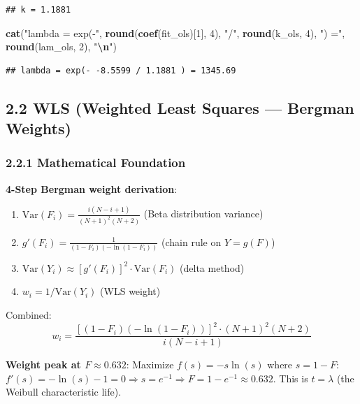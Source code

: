 \documentclass[
]{article}
\newenvironment{Shaded}{\begin{snugshade}}{\end{snugshade}}
\newcommand{\DecValTok}[1]{\textcolor[rgb]{0.00,0.00,0.81}{#1}}
\newcommand{\FunctionTok}[1]{\textcolor[rgb]{0.13,0.29,0.53}{\textbf{#1}}}
\newcommand{\NormalTok}[1]{#1}
\newcommand{\SpecialCharTok}[1]{\textcolor[rgb]{0.81,0.36,0.00}{\textbf{#1}}}
\newcommand{\StringTok}[1]{\textcolor[rgb]{0.31,0.60,0.02}{#1}}
\providecommand{\tightlist}{%
  \setlength{\itemsep}{0pt}\setlength{\parskip}{0pt}}
\begin{document}
\begin{verbatim}
## k = 1.1881
\end{verbatim}

\begin{Shaded}
\begin{Highlighting}[]
\FunctionTok{cat}\NormalTok{(}\StringTok{"lambda = exp({-}"}\NormalTok{, }\FunctionTok{round}\NormalTok{(}\FunctionTok{coef}\NormalTok{(fit\_ols)[}\DecValTok{1}\NormalTok{], }\DecValTok{4}\NormalTok{), }\StringTok{"/"}\NormalTok{, }\FunctionTok{round}\NormalTok{(k\_ols, }\DecValTok{4}\NormalTok{),}
    \StringTok{") ="}\NormalTok{, }\FunctionTok{round}\NormalTok{(lam\_ols, }\DecValTok{2}\NormalTok{), }\StringTok{"}\SpecialCharTok{\textbackslash{}n}\StringTok{"}\NormalTok{)}
\end{Highlighting}
\end{Shaded}

\begin{verbatim}
## lambda = exp(- -8.5599 / 1.1881 ) = 1345.69
\end{verbatim}

\subsection{2.2 WLS (Weighted Least Squares --- Bergman
Weights)}\label{wls-weighted-least-squares-bergman-weights}

\subsubsection{2.2.1 Mathematical
Foundation}\label{mathematical-foundation-1}

\textbf{4-Step Bergman weight derivation}:

\begin{enumerate}
\def\labelenumi{\arabic{enumi}.}
\tightlist
\item
  \(\text{Var}(F_i) = \frac{i(N-i+1)}{(N+1)^2(N+2)}\) (Beta distribution
  variance)
\item
  \(g'(F_i) = \frac{1}{(1-F_i)(-\ln(1-F_i))}\) (chain rule on
  \(Y = g(F)\))
\item
  \(\text{Var}(Y_i) \approx [g'(F_i)]^2 \cdot \text{Var}(F_i)\) (delta
  method)
\item
  \(w_i = 1/\text{Var}(Y_i)\) (WLS weight)
\end{enumerate}

Combined:
\[w_i = \frac{[(1-F_i)(-\ln(1-F_i))]^2 \cdot (N+1)^2(N+2)}{i(N-i+1)}\]

\textbf{Weight peak at \(F \approx 0.632\)}: Maximize
\(f(s) = -s \ln(s)\) where \(s = 1-F\):
\(f'(s) = -\ln(s) - 1 = 0 \Rightarrow s = e^{-1} \Rightarrow F = 1 - e^{-1} \approx 0.632\).
This is \(t = \lambda\) (the Weibull characteristic life).
\end{document}
